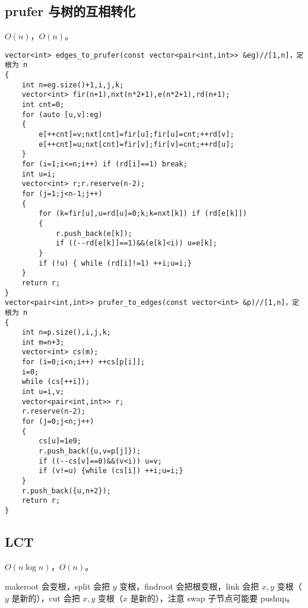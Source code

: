 \documentclass[12pt]{ctexart}
\begin{document}
\subsection{prufer 与树的互相转化}

$O(n)$，$O(n)$。

\begin{lstlisting}
vector<int> edges_to_prufer(const vector<pair<int,int>> &eg)//[1,n]，定根为 n
{
	int n=eg.size()+1,i,j,k;
	vector<int> fir(n+1),nxt(n*2+1),e(n*2+1),rd(n+1);
	int cnt=0;
	for (auto [u,v]:eg)
	{
		e[++cnt]=v;nxt[cnt]=fir[u];fir[u]=cnt;++rd[v];
		e[++cnt]=u;nxt[cnt]=fir[v];fir[v]=cnt;++rd[u];
	}
	for (i=1;i<=n;i++) if (rd[i]==1) break;
	int u=i;
	vector<int> r;r.reserve(n-2);
	for (j=1;j<n-1;j++)
	{	
		for (k=fir[u],u=rd[u]=0;k;k=nxt[k]) if (rd[e[k]]) 
		{
			r.push_back(e[k]);
			if ((--rd[e[k]]==1)&&(e[k]<i)) u=e[k];
		}
		if (!u) { while (rd[i]!=1) ++i;u=i;}
	}
	return r;
}
vector<pair<int,int>> prufer_to_edges(const vector<int> &p)//[1,n]，定根为 n
{
	int n=p.size(),i,j,k;
	int m=n+3;
	vector<int> cs(m);
	for (i=0;i<n;i++) ++cs[p[i]];
	i=0;
	while (cs[++i]);
	int u=i,v;
	vector<pair<int,int>> r;
	r.reserve(n-2);
	for (j=0;j<n;j++)
	{
		cs[u]=1e9;
		r.push_back({u,v=p[j]});
		if ((--cs[v]==0)&&(v<i)) u=v;
		if (v!=u) {while (cs[i]) ++i;u=i;}
	}
	r.push_back({u,n+2});
	return r;
}

\end{lstlisting}



\subsection{LCT}

$O(n\log n)$，$O(n)$。

makeroot 会变根，split 会把 $y$ 变根，findroot 会把根变根，link 会把 $x,y$ 变根（$y$ 是新的），cut 会把 $x,y$ 变根（$x$ 是新的），注意 swap 子节点可能要 pushup。
\end{document}
